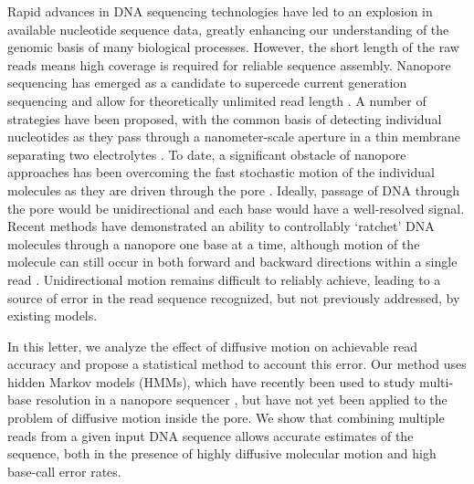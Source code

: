 \documentclass{biophys_letter}
\newcommand{\kje}[1]{\textcolor{BurntOrange}{#1}}
\begin{document}
\begin{multicols}{2}

Rapid advances in DNA sequencing technologies have led to an explosion in available nucleotide sequence data, greatly enhancing our understanding of the genomic basis of many biological processes.
However, the short length of the raw reads means high coverage is required for reliable sequence assembly.
Nanopore sequencing has emerged as a candidate to supercede current generation sequencing and allow for theoretically unlimited read length \cite{Branton:2008}.
A number of strategies have been proposed, with the common basis of detecting individual nucleotides as they pass through a nanometer-scale aperture in a thin membrane separating two electrolytes \cite{Winters-Hilt:2004}.
To date, a significant obstacle of nanopore approaches has been overcoming the fast stochastic motion of the individual molecules as they are driven through the pore \cite{Venkatesan:2011, Lu:2011}.
Ideally, passage of DNA through the pore would be unidirectional and each base would have a well-resolved signal.
Recent methods have demonstrated an ability to controllably `ratchet' DNA molecules through a nanopore one base at a time, although motion of the molecule can still occur in both forward and backward directions within a single read \cite{Olasagasti:2010, Cherf:2012}.
Unidirectional motion remains difficult to reliably achieve, leading to a source of error in the read sequence recognized, but not previously addressed, by existing models.

In this letter, we analyze the effect of diffusive motion on achievable read accuracy and propose a statistical method to \kje{account} this error.
Our method uses hidden Markov models (HMMs), which have recently been used to study multi-base resolution in a nanopore sequencer \cite{Timp:2012}, but have not yet been applied to the problem of diffusive motion inside the pore.
We show that combining multiple reads from a given input DNA sequence allows accurate estimates of the sequence, both in the presence of highly diffusive molecular motion and high base-call error rates.


\end{multicols}
\end{document}
